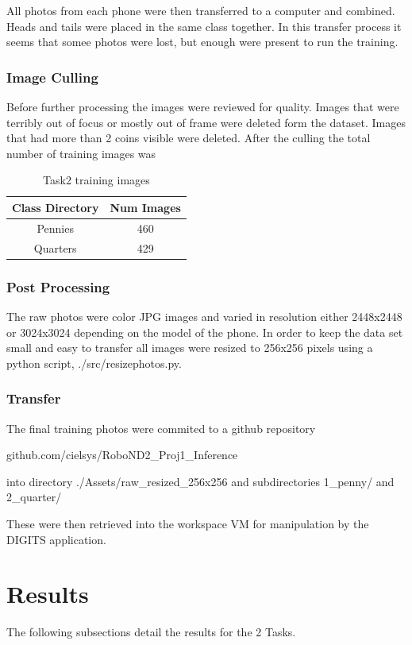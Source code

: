 \documentclass[10pt,journal,compsoc]{IEEEtran}
\begin{document}
All photos from each phone were then transferred to a computer and combined. Heads and tails were placed in the same class together. In this transfer process it seems that somee photos were lost, but enough were present to run the training.

\subsubsection{Image Culling}
Before further processing the images were reviewed for quality. Images that were terribly out of focus or mostly out of frame were deleted form the dataset. Images that had more than 2 coins visible were deleted. After the culling the total number of training images was 

\begin{table}[h]
\caption{Task2 training images}
\label{Task2 training images}
\begin{center}
\begin{tabular}{|c||c|}
\hline
Class Directory & Num Images\\
\hline
Pennies & 460\\
Quarters & 429\\
\hline
\end{tabular}
\end{center}
\end{table}

\subsubsection{Post Processing}
The raw photos were color JPG images and varied in resolution either
2448x2448 or 3024x3024 depending on the model of the phone. In order to keep the data set small and easy to transfer all images were resized to 256x256 pixels using a python script, ./src/resizephotos.py.

\subsubsection{Transfer}
The final training photos were commited to a github repository

github.com/cielsys/RoboND2\_Proj1\_Inference

into directory ./Assets/raw\_resized\_256x256
and subdirectories
1\_penny/ and 2\_quarter/

These were then retrieved into the workspace VM for manipulation by the DIGITS application.

\section{Results}
The following subsections detail the results for the 2 Tasks.
\end{document}
